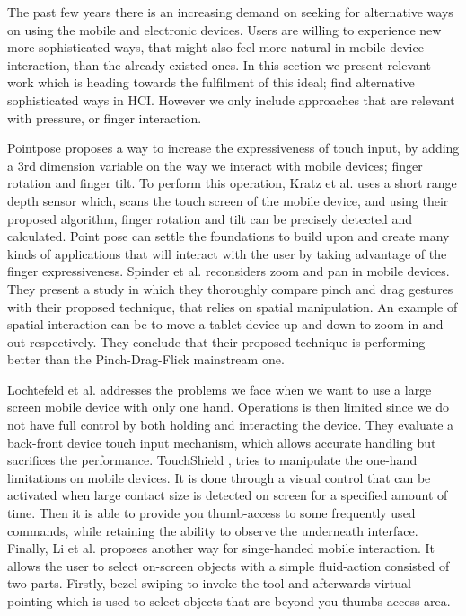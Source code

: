 The past few years there is an increasing demand on seeking for alternative ways on using the mobile and electronic devices. Users are willing to experience new more sophisticated ways, that might also feel more natural in mobile device interaction, than the already existed ones. In this section we present relevant work which is heading towards the fulfilment of this ideal; find alternative sophisticated ways in HCI. However we only include approaches that are relevant with pressure, or finger interaction.

Pointpose \cite{Kratz:2013:PFP:2512349.2512824} proposes a way to increase the expressiveness of touch input, by adding a 3rd dimension variable on the way we interact with mobile devices; finger rotation and finger tilt. To perform this operation, Kratz et al. uses  a short range depth sensor which, scans the touch screen of the mobile device, and using their proposed algorithm, finger rotation and tilt can be precisely detected and calculated. Point pose can settle the foundations to build upon and create many kinds of applications that will interact with the user by taking advantage of the finger expressiveness.
Spinder et al. \cite{Spindler:2014:PVS:2556288.2557028} reconsiders zoom and pan in mobile devices. They present a study in which they thoroughly compare pinch and drag gestures with their proposed technique, that relies on spatial manipulation. An example of spatial interaction can be to move a tablet device up and down to zoom in and out respectively. They conclude that their proposed technique is performing better than the Pinch-Drag-Flick mainstream one.

Lochtefeld et al. \cite{Lochtefeld:2013:EHF:2541831.2541865} addresses the problems we face when we want to use a large screen mobile device with only one hand. Operations is then limited since we do not have full control by both holding and interacting the device. They evaluate a back-front device touch input mechanism, which allows accurate handling but sacrifices the performance. 
TouchShield \cite{Hong:2013:TVC:2468356.2468589}, tries to manipulate the one-hand limitations on mobile devices. It is done through a visual control that can be activated when large contact size is detected on screen for a specified amount of time. Then it is able to provide you thumb-access to some frequently used commands, while retaining the ability to observe the underneath interface. 
Finally, Li et al. \cite{Li:2013:BBC:2543651.2543680} proposes another way for singe-handed mobile interaction. It allows the user to select on-screen objects with a simple fluid-action consisted of two parts. Firstly, bezel swiping to invoke the tool and afterwards virtual pointing which is used to select objects that are beyond you thumbs access area.



